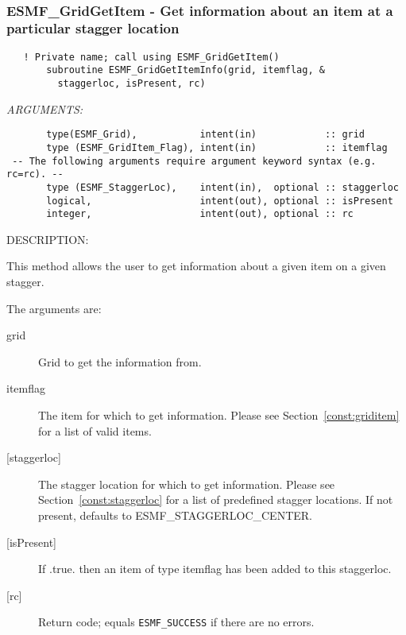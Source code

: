  
\mbox{}\hrulefill\ 
 

  \label{API:GridGetItemInfo}\subsubsection [ESMF\_GridGetItem] {ESMF\_GridGetItem - Get information about an item at a particular stagger location}


 
\begin{verbatim}   ! Private name; call using ESMF_GridGetItem()
       subroutine ESMF_GridGetItemInfo(grid, itemflag, &
         staggerloc, isPresent, rc)\end{verbatim}{\em ARGUMENTS:}
\begin{verbatim}       type(ESMF_Grid),           intent(in)            :: grid
       type (ESMF_GridItem_Flag), intent(in)            :: itemflag
 -- The following arguments require argument keyword syntax (e.g. rc=rc). --
       type (ESMF_StaggerLoc),    intent(in),  optional :: staggerloc
       logical,                   intent(out), optional :: isPresent
       integer,                   intent(out), optional :: rc\end{verbatim}
{\sf DESCRIPTION:\\ }


      This method allows the user to get information about a given item on a given
      stagger.
  
       The arguments are:
       \begin{description}
       \item[grid]
            Grid to get the information from.
       \item[itemflag]
            The item for which to get information. Please see Section~\ref{const:griditem} for a
            list of valid items.
       \item[{[staggerloc]}]
            The stagger location for which to get information.
            Please see Section~\ref{const:staggerloc} for a list
            of predefined stagger locations. If not present, defaults to ESMF\_STAGGERLOC\_CENTER.
       \item[{[isPresent]}]
            If .true. then an item of type itemflag has been added to this staggerloc.
       \item[{[rc]}]
            Return code; equals {\tt ESMF\_SUCCESS} if there are no errors.
     \end{description}
   

